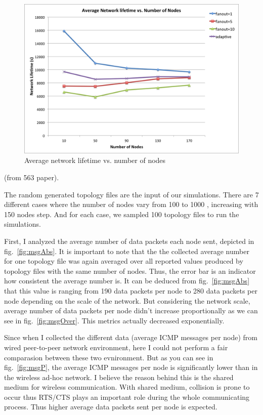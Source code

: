 \begin{figure}
	\centering
	\includegraphics[width=5.5in]{life.png}
	\caption{Average network lifetime vs. number of nodes}
	\label{fig:life}
\end{figure}





(from 563 paper).

The random generated topology files are the input of our simulations. There are 7 different cases where the number of nodes vary from 100 to 1000 , increasing with 150 nodes step. And for each case, we sampled 100 topology files to run the simulations.

First, I analyzed the average number of data packets each node sent, depicted in fig.~\ref{fig:msgAbs}. It is important to note that the the collected average number for one topology file was again averaged over all reported values produced by topology files with the same number of nodes. Thus, the error bar is an indicator how consistent the average number is. It can be deduced from fig.~\ref{fig:msgAbs} that this value is ranging from 190 data packets per node to 280 data packets per node depending on the scale of the network. But considering the network scale, average number of data packets per node didn't increase proportionally as we can see in fig.~\ref{fig:msgOver}. This metrics actually decreased exponentially. 


Since when I collected the different data (average ICMP messages per node) from wired peer-to-peer network environment, here I could not perform a fair comparasion between these two evnironment. But as you can see in fig.~\ref{fig:msgP}, the average ICMP messages per node is significantly lower than in the wireless ad-hoc network. I believe the reason behind this is the shared medium for wireless communication. With shared medium, collision is prone to occur thus RTS/CTS plays an important role during the whole communicating process. Thus higher average data packets sent per node is expected.

